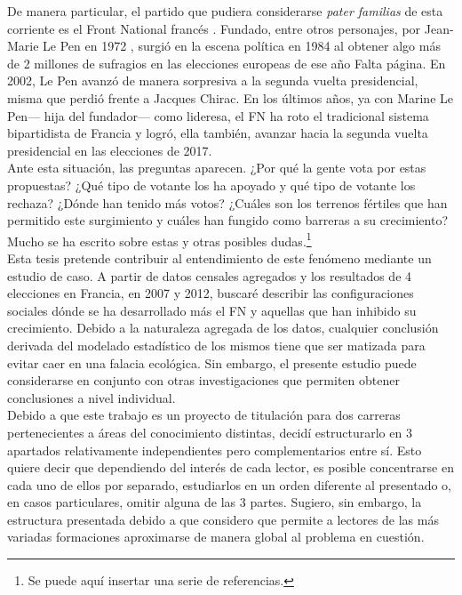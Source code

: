 De manera particular, el partido que pudiera considerarse \textit{pater familias} de esta corriente es el Front National francés \parencite[14]{Mudde07a}. Fundado, entre otros personajes, por Jean-Marie Le Pen en 1972 \parencite[10]{Stockemer17}, surgió en la escena política en 1984 al obtener algo más de 2 millones de sufragios en las elecciones europeas de ese año {\color{Red}\parencite{LeBras15} Falta página}. En 2002, Le Pen avanzó de manera sorpresiva a la segunda vuelta presidencial, misma que perdió frente a Jacques Chirac. En los últimos años, ya con Marine Le Pen--- hija del fundador--- como lideresa, el FN ha roto el tradicional sistema bipartidista de Francia \parencite{LeBras16} y logró, ella también, avanzar hacia la segunda vuelta presidencial en las elecciones de 2017.\\

Ante esta situación, las preguntas aparecen. ¿Por qué la gente vota por estas propuestas? ¿Qué tipo de votante los ha apoyado y qué tipo de votante los rechaza? ¿Dónde han tenido más votos? ¿Cuáles son los terrenos fértiles que han permitido este surgimiento y cuáles han fungido como barreras a su crecimiento? {\color{Aquamarine}Mucho se ha escrito sobre estas y otras posibles dudas.\footnote{ Se puede aquí insertar una serie de referencias.}}\\

Esta tesis pretende contribuir al entendimiento de este fenómeno mediante un estudio de caso. A partir de datos censales agregados y los resultados de 4 elecciones en Francia, en 2007 y 2012, buscaré describir las configuraciones sociales dónde se ha desarrollado más el FN y aquellas que han inhibido su crecimiento. Debido a la naturaleza agregada de los datos, cualquier conclusión derivada del modelado estadístico de los mismos tiene que ser matizada para evitar caer en una falacia ecológica. {\color{Red} Sin embargo, el presente estudio puede considerarse en conjunto con otras investigaciones que permiten obtener conclusiones a nivel individual.}\\ 

Debido a que este trabajo es un proyecto de titulación para dos carreras pertenecientes a áreas del conocimiento distintas, decidí estructurarlo en 3 apartados relativamente independientes pero complementarios entre sí. Esto quiere decir que dependiendo del interés de cada lector, es posible concentrarse en cada uno de ellos por separado, estudiarlos en un orden diferente al presentado o, en casos particulares, omitir alguna de las 3 partes. Sugiero, sin embargo, la estructura presentada debido a que considero que permite a lectores de las más variadas formaciones aproximarse de manera global al problema en cuestión.\\ 

